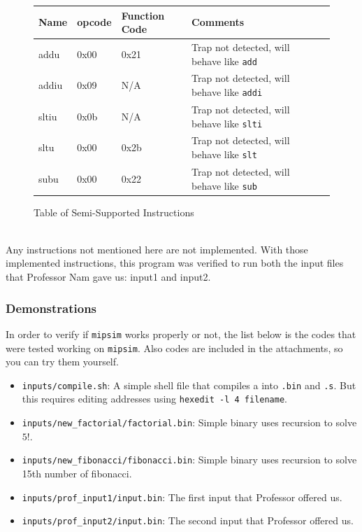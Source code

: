 \documentclass{homework}
\begin{document}
\begin{figure}[h]
\begin{center}
\begin{tabular}{|l|l|l|l|l|}
    \hline
        \textbf{Name} & \textbf{opcode} & \textbf{Function Code} & \textbf{Comments}\\
    \hline
        addu & 0x00 & 0x21 & Trap not detected, will behave like \texttt{add}\\
        addiu & 0x09 & N/A & Trap not detected, will behave like \texttt{addi}\\
        sltiu & 0x0b & N/A & Trap not detected, will behave like \texttt{slti}\\
        sltu & 0x00 & 0x2b & Trap not detected, will behave like \texttt{slt}\\
        subu & 0x00 & 0x22 & Trap not detected, will behave like \texttt{sub}\\
    \hline
\end{tabular}
\caption{Table of Semi-Supported Instructions}
\end{center}
\end{figure}
\\
Any instructions not mentioned here are not implemented. With those implemented instructions, this program was verified to run both the input files that Professor Nam gave us: input1 and input2. 
\pagebreak

\subsubsection{Demonstrations}
In order to verify if \texttt{mipsim} works properly or not, the list below is the codes that were tested working on \texttt{mipsim}. Also codes are included in the attachments, so you can try them yourself.

\begin{itemize}
    \item \texttt{inputs/compile.sh}: A simple shell file that compiles a  into \texttt{.bin} and \texttt{.s}. But this requires editing addresses using \texttt{hexedit -l 4 filename}.
    \item \texttt{inputs/new_factorial/factorial.bin}: Simple binary uses recursion to solve $5!$. 
    \item \texttt{inputs/new_fibonacci/fibonacci.bin}: Simple binary uses recursion to solve 15th number of fibonacci.
    \item \texttt{inputs/prof_input1/input.bin}: The first input that Professor offered us.
    \item \texttt{inputs/prof_input2/input.bin}: The second input that Professor offered us.
\end{itemize}
\end{document}
